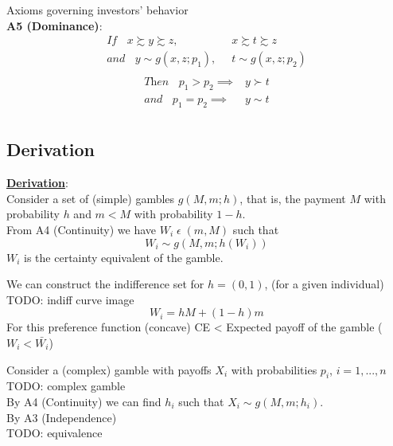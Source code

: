 \documentclass[
14pt,notheorems,hyperref={pdfauthor=whatever}
]{beamer}
\begin{document}
\begin{frame}
Axioms governing investors' behavior\\
\hfill \break
\textbf{A5 (Dominance)}:
\begin{align*}
    \textit{If }\;\;x \succsim y \succsim z,&\;\; x \succsim t \succsim z\\
    \textit{and }\;\;y \sim g(x,z;p_1),&\;\; t \sim g(x,z;p_2)\\
\end{align*}
\begin{align*}
    \textit{Then }\;\;p_1 > p_2 \implies& y \succ t\\
    \textit{and }\;\;p_1 = p_2 \implies& y \sim t\\
\end{align*}
\end{frame}

\subsection{Derivation}

\begin{frame}
\underline{\textbf{Derivation}}:\\
\hfill \break
Consider a set of (simple) gambles $g(M,m;h)$, that is, the payment $M$ with probability $h$ and $m<M$ with probability $1-h$.\\
From A4 (Continuity) we have $W_i\;\epsilon\;(m,M)$ such that\\
\[W_i \sim g(M,m;h(W_i))\]
\hfill \break
$W_i$ is the certainty equivalent of the gamble.
\end{frame}

\begin{frame}
We can construct the indifference set for $h=(0,1)$, (for a given individual)\\
TODO: indiff curve image\\
\[W_i = hM+(1-h)m\]
\hfill \break
For this preference function (concave) CE < Expected payoff of the gamble ($W_i<\bar{W_i}$)
\end{frame}

\begin{frame}
Consider a (complex) gamble with payoffs $X_i$ with probabilities $p_i$, $i=1,...,n$\\
TODO: complex gamble\\
By A4 (Continuity) we can find $h_i$ such that $X_i \sim g(M,m;h_i)$.\\
By A3 (Independence)\\
TODO: equivalence
\end{frame}
\end{document}

